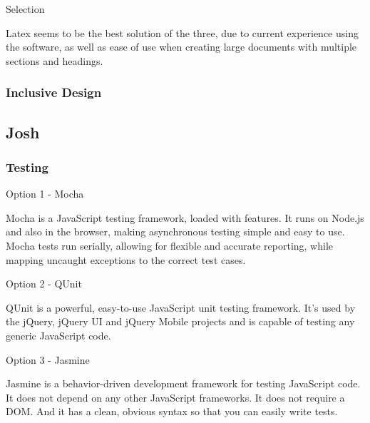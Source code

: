 \documentclass[letterpaper, 10pt, draftclsnofoot, compsoc, onecolumn]{IEEEtran}
\begin{document}
{\medskip
{\noindent Selection \par}
{\noindent Latex seems to be the best solution of the three, due to current experience using the software, as well as ease of use when creating large documents with multiple sections and headings. \par}

\newpage
\subsubsection{Inclusive Design}
{\noindent \par}

\medskip


\newpage
\subsection{Josh}
\vspace{1pc}

\subsubsection{Testing}
{\noindent \par}

{\noindent Option 1 - Mocha \par}
{\noindent Mocha is a JavaScript testing framework, loaded with features. It runs on Node.js and also in the browser, making asynchronous testing simple and easy to use. Mocha tests run serially, allowing for flexible and accurate reporting, while mapping uncaught exceptions to the correct test cases. \cite{Mocha} \par}

\medskip
{\noindent Option 2 - QUnit \par}
{\noindent QUnit is a powerful, easy-to-use JavaScript unit testing framework. It's used by the jQuery, jQuery UI and jQuery Mobile projects and is capable of testing any generic JavaScript code. \cite{QUnit}  \par}

\medskip
{\noindent Option 3 - Jasmine \par}
{\noindent Jasmine is a behavior-driven development framework for testing JavaScript code. It does not depend on any other JavaScript frameworks. It does not require a DOM. And it has a clean, obvious syntax so that you can easily write tests. \cite{Jasmine}  \par}

}
\end{document}
